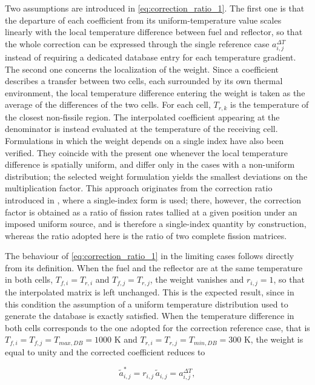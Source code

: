 \documentclass[preprint,review,12pt]{elsarticle}
\newif\ifhighlight
\newcommand{\rtwo}[1]{\ifhighlight\textcolor{revtwo}{#1}\else#1\fi}
\newcommand{\rtwocolor}{\ifhighlight\color{revtwo}\fi}
\begin{document}
\rtwo{Two assumptions are introduced in \cref{eq:correction_ratio_1}. The first one is that the departure of each coefficient from its uniform-temperature value scales linearly with the local temperature difference between fuel and reflector, so that the whole correction can be expressed through the single reference case $a_{i,j}^{\Delta T}$ instead of requiring a dedicated database entry for each temperature gradient. The second one concerns the localization of the weight. Since a coefficient describes a transfer between two cells, each surrounded by its own thermal environment, the local temperature difference entering the weight is taken as the average of the differences of the two cells. For each cell, $T_{r,k}$ is the temperature of the closest non-fissile region. The interpolated coefficient appearing at the denominator is instead evaluated at the temperature of the receiving cell. Formulations in which the weight depends on a single index have also been verified. They coincide with the present one whenever the local temperature difference is spatially uniform, and differ only in the cases with a non-uniform distribution; the selected weight formulation yields the smallest deviations on the multiplication factor. This approach originates from the correction ratio introduced in \cite{He2019}, where a single-index form is used; there, however, the correction factor is obtained as a ratio of fission rates tallied at a given position under an imposed uniform source, and is therefore a single-index quantity by construction, whereas the ratio adopted here is the ratio of two complete fission matrices.}

\rtwo{The behaviour of \cref{eq:correction_ratio_1} in the limiting cases follows directly from its definition. When the fuel and the reflector are at the same temperature in both cells, $T_{f,i} = T_{r,i}$ and $T_{f,j} = T_{r,j}$, the weight vanishes and $r_{i,j} = 1$, so that the interpolated matrix is left unchanged. This is the expected result, since in this condition the assumption of a uniform temperature distribution used to generate the database is exactly satisfied. When the temperature difference in both cells corresponds to the one adopted for the correction reference case, that is $T_{f,i} = T_{f,j} = T_{max,DB} = 1000$ K and $T_{r,i} = T_{r,j} = T_{min,DB} = 300$ K, the weight is equal to unity and the corrected coefficient reduces to}

\begin{equation}
\rtwocolor \tilde{a}_{i,j}^{*} = r_{i,j} \, \tilde{a}_{i,j} = a_{i,j}^{\Delta T},
\label{eq:correction_limiting_case}
\end{equation}
\end{document}
